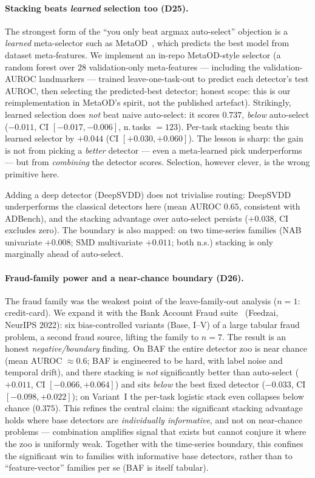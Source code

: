 \documentclass[11pt,titlepage]{article}
\begin{document}
\paragraph{Stacking beats \emph{learned} selection too (D25).}
The strongest form of the ``you only beat argmax auto-select'' objection is a
\emph{learned} meta-selector such as MetaOD~\cite{metaod_th}, which predicts the
best model from dataset meta-features. We implement an in-repo MetaOD-style selector
(a random forest over $28$ validation-only meta-features --- including the
validation-AUROC landmarkers --- trained leave-one-task-out to predict each
detector's test AUROC, then selecting the predicted-best detector; honest scope:
this is our reimplementation in MetaOD's spirit, not the published artefact).
Strikingly, learned selection does \emph{not} beat naive auto-select: it scores
$0.737$, \emph{below} auto-select ($-0.011$, CI $[-0.017,-0.006]$, n.\,tasks $=123$).
Per-task stacking beats this learned selector by $+0.044$ (CI $[+0.030,+0.060]$).
The lesson is sharp: the gain is not from picking a \emph{better} detector --- even a
meta-learned pick underperforms --- but from \emph{combining} the detector scores.
Selection, however clever, is the wrong primitive here.

Adding a deep detector (DeepSVDD) does not trivialise routing: DeepSVDD underperforms
the classical detectors here (mean AUROC $0.65$, consistent with ADBench), and the
stacking advantage over auto-select persists ($+0.038$, CI excludes zero). The boundary is also mapped: on two time-series families
(NAB univariate $+0.008$; SMD multivariate $+0.011$; both n.s.) stacking is only
marginally ahead of auto-select.

\paragraph{Fraud-family power and a near-chance boundary (D26).}
The fraud family was the weakest point of the leave-family-out analysis ($n{=}1$:
credit-card). We expand it with the Bank Account Fraud suite~\cite{baf_th}
(Feedzai, NeurIPS 2022): six bias-controlled variants (Base, I--V) of a large
tabular fraud problem, a second fraud source, lifting the family to $n{=}7$. The
result is an honest \emph{negative/boundary} finding. On BAF the entire detector zoo
is near chance (mean AUROC $\approx 0.6$; BAF is engineered to be hard, with label
noise and temporal drift), and there stacking is \emph{not} significantly better
than auto-select ($+0.011$, CI $[-0.066,+0.064]$) and sits \emph{below} the best
fixed detector ($-0.033$, CI $[-0.098,+0.022]$); on Variant~I the per-task logistic
stack even collapses below chance ($0.375$). This refines the central claim: the
significant stacking advantage holds where base detectors are \emph{individually
informative}, and not on near-chance problems --- combination amplifies signal that
exists but cannot conjure it where the zoo is uniformly weak. Together with the
time-series boundary, this confines the significant win to families with informative
base detectors, rather than to ``feature-vector'' families per se (BAF is itself
tabular).
\end{document}
